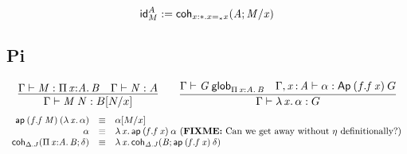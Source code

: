 \[\idt{A}{M}:=\coh{x:\diagbase.\homj{\diagbase}{x}{x}}{A}{M/x}\]

\subsection{Pi}

\begin{small}
  \[
  \infer{\ofglob{\Gamma}{\app{M}{N}}{\subst{B}{N}{x}}}
  {\ofglob{\Gamma}{M}{\picl{x}{A}{B}} & \ofglob{\Gamma}{N}{A}} \qquad
  \infer{\ofglob{\Gamma}{\ulam{x}{\alpha}}{G}}
  {\wfglob{\Gamma}{G}{n}{\picl{x}{A}{B}} &
    \ofglob{\Gamma,\tptm{x}{A}}{\alpha}{\Apn{n}{(f.\app{f}{x})}{G}}}
  \]
\[
  \begin{array}{rcl}
  \apn{n}{(f.\app f M)}{(\ulam{x}{\alpha})} & \equiv & \tsubst{\alpha}{M/x} \\

\alpha & \equiv & \ulam{x}{\apn{n}{(f.\app f x)}{\alpha}} \text{ (\FIXME{Can we get away without $\eta$ definitionally?})} \\

\coh{\Delta.J}{\picl{x}{A}{B}}{\delta} & \equiv & \ulam{x}{\coh{\Delta.J}{B}{\apn{}{(f.\app f x)}{\delta}}} \\
 
\end{array}
\]
\end{small}

